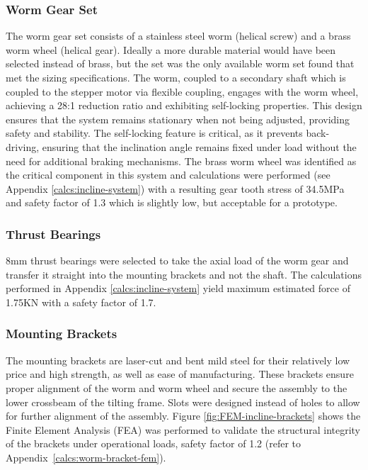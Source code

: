 \subsubsection{Worm Gear Set}

The worm gear set consists of a stainless steel worm (helical screw) and a brass worm wheel (helical gear). Ideally a more durable material would have been selected instead of brass, but the set was the only available worm set found that met the sizing specifications. The worm, coupled to a secondary shaft which is coupled to the stepper motor via flexible coupling, engages with the worm wheel, achieving a 28:1 reduction ratio and exhibiting self-locking properties. This design ensures that the system remains stationary when not being adjusted, providing safety and stability. The self-locking feature is critical, as it prevents back-driving, ensuring that the inclination angle remains fixed under load without the need for additional braking mechanisms. The brass worm wheel was identified as the critical component in this system and calculations were performed (see Appendix \ref{calcs:incline-system}) with a resulting gear tooth stress of 34.5MPa and safety factor of 1.3 which is slightly low, but acceptable for a prototype.

\subsubsection{Thrust Bearings}
8mm thrust bearings were selected to take the axial load of the worm gear and transfer it straight into the mounting brackets and not the shaft. The calculations performed in Appendix \ref{calcs:incline-system} yield maximum estimated force of 1.75KN with a safety factor of 1.7.


\subsubsection{Mounting Brackets}

The mounting brackets are laser-cut and bent mild steel for their relatively low price and high strength, as well as ease of manufacturing. These brackets ensure proper alignment of the worm and worm wheel and secure the assembly to the lower crossbeam of the tilting frame. Slots were designed instead of holes to allow for further alignment of the assembly. Figure \ref{fig:FEM-incline-brackets} shows the Finite Element Analysis (FEA) was performed to validate the structural integrity of the brackets under operational loads, safety factor of 1.2 (refer to Appendix~\ref{calcs:worm-bracket-fem}).

